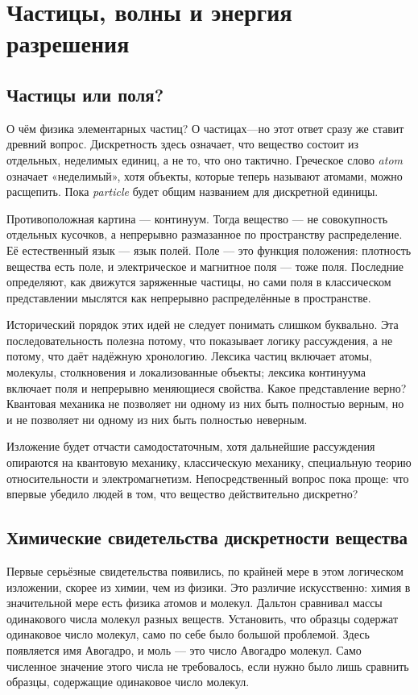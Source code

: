 \chapter{Частицы, волны и энергия разрешения}

\section{Частицы или поля?}

О чём физика элементарных частиц? О частицах---но этот ответ сразу же ставит древний вопрос. Дискретность здесь означает, что вещество состоит из отдельных, неделимых единиц, а не то, что оно тактично. Греческое слово \emph{atom} означает «неделимый», хотя объекты, которые теперь называют атомами, можно расщепить. Пока \emph{particle} будет общим названием для дискретной единицы.

Противоположная картина — континуум. Тогда вещество — не совокупность отдельных кусочков, а непрерывно размазанное по пространству распределение. Её естественный язык — язык полей. Поле — это функция положения: плотность вещества есть поле, и электрическое и магнитное поля — тоже поля. Последние определяют, как движутся заряженные частицы, но сами поля в классическом представлении мыслятся как непрерывно распределённые в пространстве.

Исторический порядок этих идей не следует понимать слишком буквально. Эта последовательность полезна потому, что показывает логику рассуждения, а не потому, что даёт надёжную хронологию. Лексика частиц включает атомы, молекулы, столкновения и локализованные объекты; лексика континуума включает поля и непрерывно меняющиеся свойства. Какое представление верно? Квантовая механика не позволяет ни одному из них быть полностью верным, но и не позволяет ни одному из них быть полностью неверным.

Изложение будет отчасти самодостаточным, хотя дальнейшие рассуждения опираются на квантовую механику, классическую механику, специальную теорию относительности и электромагнетизм. Непосредственный вопрос пока проще: что впервые убедило людей в том, что вещество действительно дискретно?

\section{Химические свидетельства дискретности вещества}

Первые серьёзные свидетельства появились, по крайней мере в этом логическом изложении, скорее из химии, чем из физики. Это различие искусственно: химия в значительной мере есть физика атомов и молекул. Дальтон сравнивал массы одинакового числа молекул разных веществ. Установить, что образцы содержат одинаковое число молекул, само по себе было большой проблемой. Здесь появляется имя Авогадро, и моль — это число Авогадро молекул. Само численное значение этого числа не требовалось, если нужно было лишь сравнить образцы, содержащие одинаковое число молекул.

